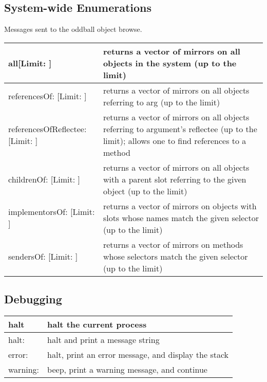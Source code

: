 \documentclass[letterpaper,10pt,english]{sphinxmanual}
\begin{document}
\subsection{System-wide Enumerations}
\label{\detokenize{usefulselectors:system-wide-enumerations}}
Messages sent to the oddball object browse.

\noindent\begin{tabulary}{\linewidth}{p{5cm} p{10cm}}
\hline

all{[}Limit: {]}
&
returns a vector of mirrors on all objects in the system (up to the limit)
\\
\hline
referencesOf: {[}Limit: {]}
&
returns a vector of mirrors on all objects referring to arg (up to the limit)
\\
\hline
referencesOfReflectee: {[}Limit: {]}
&
returns a vector of mirrors on all objects referring to argument’s reflectee (up to the limit); allows one to find references to a method
\\
\hline
childrenOf: {[}Limit: {]}
&
returns a vector of mirrors on all objects with a parent slot referring to the given object (up to the limit)
\\
\hline
implementorsOf: {[}Limit: {]}
&
returns a vector of mirrors on objects with slots whose names match the given selector (up to the limit)
\\
\hline
sendersOf: {[}Limit: {]}
&
returns a vector of mirrors on methods whose selectors match the given selector (up to the limit)
\\
\hline\end{tabulary}



\subsection{Debugging}
\label{\detokenize{usefulselectors:debugging}}
\noindent\begin{tabulary}{\linewidth}{p{5cm} p{10cm}}
\hline

halt
&
halt the current process
\\
\hline
halt:
&
halt and print a message string
\\
\hline
error:
&
halt, print an error message, and display the stack
\\
\hline
warning:
&
beep, print a warning message, and continue
\\
\hline\end{tabulary}
\end{document}
